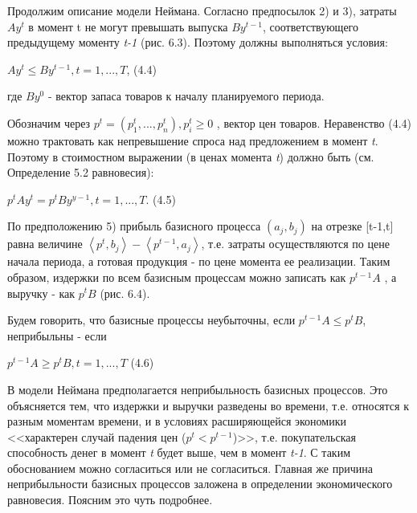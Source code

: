 \documentclass[12pt, 4paper]{book}
\begin{document}
{Продолжим описание модели Неймана. Согласно предпосылок 2) и 3), затраты $A y^t$ в момент t не могут превышать выпуска $By^{t-1}$, соответствующего предыдущему моменту \textit{t-1} (рис. 6.3).
Поэтому должны выполняться условия:
\begin{center}
$A y^t \leq B y^{t-1}, t=1,...,T$, (4.4)
\end{center}
где $B y^0$ - вектор запаса товаров к началу планируемого периода.
\par

Обозначим через $p^t=(p_{1}^t,...,p_{n}^t), p_{i}^t \geq 0$ , вектор цен товаров. Неравенство (4.4) можно трактовать как непревышение спроса над предложением в момент \textit{t}. Поэтому в стоимостном выражении (в ценах момента \textit{t}) должно быть (см. Определение 5.2 равновесия):
\begin{center}
$p^t A y^t = p^t B y^{y-1}, t=1,...,T$. (4.5)
\end{center}
\par

По предположению 5) прибыль базисного процесса $(a_j,b_j)$ на отрезке [t-1,t] равна величине $\left\langle p^t,b_j\right\rangle - \left\langle p^{t-1},a_j \right\rangle$, т.е. затраты осуществляются по цене начала периода, а готовая продукция - по цене момента ее реализации. Таким образом, издержки по всем базисным процессам можно записать как $p^{t-1}A$ , а выручку - как $p^t B$ (рис. 6.4).
\par

Будем говорить, что базисные процессы неубыточны, если $p^{t-1} A \leq p^t B$, неприбыльны - если
\begin{center}
$p^{t-1}A \geq p^t B, t=1,...,T$ (4.6)
\end{center}
\par

В модели Неймана предполагается неприбыльность базисных процессов. Это объясняется тем, что издержки и выручки разведены во времени, т.е. относятся к разным моментам времени, и в условиях расширяющейся экономики <<характерен случай падения цен ($p^t < p^{t-1}$)>>, т.е. покупательская способность денег в момент \textit{t} будет выше, чем в момент \textit{t-1}. С таким обоснованием можно согласиться или не согласиться. Главная же причина неприбыльности базисных процессов заложена в определении экономического равновесия. Поясним это чуть подробнее.
\par

}
\end{document}
